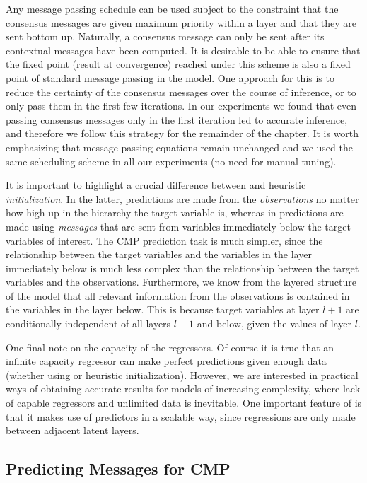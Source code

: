 Any message passing schedule can be used subject to the constraint that the consensus messages are given maximum priority within a layer and that they are sent bottom up. Naturally, a consensus message can only be sent after its contextual messages have been computed. It is desirable to be able to ensure that the fixed point (result at convergence) reached under this scheme is also a fixed point of standard message passing in the model. One approach for this is to reduce the certainty of the consensus messages over the course of inference, or to only pass them in the first few iterations. In our experiments we found that even passing consensus messages only in the first iteration led to accurate inference, and therefore we follow this strategy for the remainder of the chapter. It is worth emphasizing that message-passing equations remain unchanged and we used the same scheduling scheme in all our experiments (\ie no need for manual tuning).

It is important to highlight a crucial difference between \method and heuristic \textit{initialization}. In the latter, predictions are made from the \textit{observations} no matter how high up in the hierarchy the target variable is, whereas in \MTD predictions are made using \textit{messages} that are sent from variables immediately below the target variables of interest. The CMP prediction task is much simpler, since the relationship between the target variables and the variables in the layer immediately below is much less complex than the relationship between the target variables and the observations. Furthermore, we know from the layered structure of the model that all relevant information from the observations is contained in the variables in the layer below.  This is because target variables at layer $l+1$ are conditionally independent of all layers $l-1$ and below, given the values of layer $l$.

One final note on the capacity of the regressors. Of course it is true that an infinite capacity regressor can make perfect predictions given enough data (whether using \MTD or heuristic initialization). However, we are interested in practical ways of obtaining accurate results for models of increasing complexity, where lack of capable regressors and unlimited data is inevitable. One important feature of \MTD is that it makes use of predictors in a scalable way, since regressions are only made between adjacent latent layers.

\subsection{Predicting Messages for CMP}
\label{sec:training-chap4}

